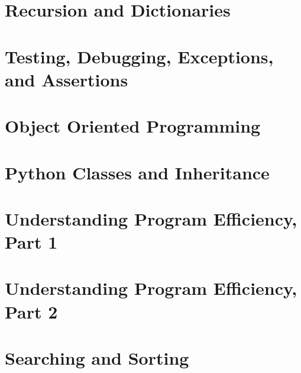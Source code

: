 \documentclass[letterpaper,12pt]{article}
\begin{document}
\section{Recursion and Dictionaries}



\section{Testing, Debugging, Exceptions, and Assertions}




\section{Object Oriented Programming}



\section{Python Classes and Inheritance}



\section{Understanding Program Efficiency, Part 1}

\section{Understanding Program Efficiency, Part 2}




\section{Searching and Sorting}
\end{document}

